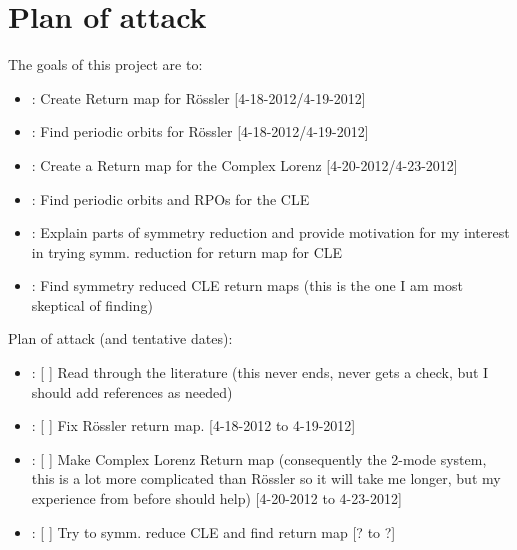\documentclass[12 pt]{article}
\begin{document}
\section{Plan of attack}
The goals of this project are to:
\begin{itemize}
    \item: Create Return map for R\"ossler [4-18-2012/4-19-2012]
    \item: Find periodic orbits for R\"ossler [4-18-2012/4-19-2012]
    \item: Create a Return map for the Complex Lorenz [4-20-2012/4-23-2012]
    \item: Find periodic orbits and RPOs for the CLE
    \item: Explain parts of symmetry reduction and provide motivation for my interest in trying symm. reduction for return map for CLE
    \item: Find symmetry reduced CLE return maps (this is the one I am most skeptical of finding)
\end{itemize}
Plan of attack (and tentative dates):
\begin{itemize}
    \item:   [  ] Read through the literature (this never ends, never gets a check, but I should add references as needed)
    \item:   [  ] Fix R\"ossler return map. [4-18-2012 to 4-19-2012]
    \item:   [  ] Make Complex Lorenz Return map (consequently the 2-mode system, this is a lot more complicated than R\"ossler so it will take me longer, but my experience from before should help) [4-20-2012 to 4-23-2012]
    \item:   [  ] Try to symm. reduce CLE and find return map [? to ?]
\end{itemize}

\newpage

\end{document}
